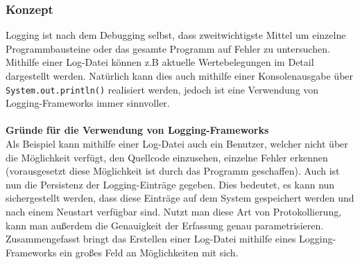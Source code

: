 \subsubsection{Konzept}\label{sssec:logOverview}
Logging ist nach dem Debugging selbst, dass zweitwichtigste Mittel um einzelne Programmbausteine oder das gesamte Programm auf Fehler zu untersuchen.
Mithilfe einer Log-Datei können z.B aktuelle Wertebelegungen im Detail dargestellt werden.
Natürlich kann dies auch mithilfe einer Konsolenausgabe über \lstinline[style=java]{System.out.println()} realisiert werden, jedoch ist eine Verwendung von Logging-Frameworks immer sinnvoller.\\\\
\textbf{Gründe für die Verwendung von Logging-Frameworks}\\
Als Beispiel kann mithilfe einer Log-Datei auch ein Benutzer, welcher nicht über die Möglichkeit verfügt, den Quellcode einzusehen, einzelne Fehler erkennen (vorausgesetzt diese Möglichkeit ist durch das Programm geschaffen).
Auch ist nun die Persistenz der Logging-Einträge gegeben.
Dies bedeutet, es kann nun sichergestellt werden, dass diese Einträge auf dem System gespeichert werden und nach einem Neustart verfügbar sind.
Nutzt man diese Art von Protokollierung, kann man außerdem die Genauigkeit der Erfassung genau parametrisieren.\\
Zusammengefasst bringt das Erstellen einer Log-Datei mithilfe eines Logging-Frameworks ein großes Feld an Möglichkeiten mit sich.\\\\

